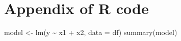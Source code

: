 \documentclass[
  openany]{book}
\newenvironment{Shaded}{\begin{snugshade}}{\end{snugshade}}
\newcommand{\AttributeTok}[1]{\textcolor[rgb]{0.77,0.63,0.00}{#1}}
\newcommand{\FunctionTok}[1]{\textcolor[rgb]{0.00,0.00,0.00}{#1}}
\newcommand{\NormalTok}[1]{#1}
\newcommand{\OtherTok}[1]{\textcolor[rgb]{0.56,0.35,0.01}{#1}}
\newcommand{\SpecialCharTok}[1]{\textcolor[rgb]{0.00,0.00,0.00}{#1}}
\begin{document}
\hypertarget{appendix-appendix}{%
\appendix}


\hypertarget{appendix-of-r-code}{%
\chapter*{Appendix of R code}\label{appendix-of-r-code}}

\begin{Shaded}
\begin{Highlighting}[]
\NormalTok{model }\OtherTok{\textless{}{-}} \FunctionTok{lm}\NormalTok{(y }\SpecialCharTok{\textasciitilde{}}\NormalTok{ x1 }\SpecialCharTok{+}\NormalTok{ x2, }\AttributeTok{data =}\NormalTok{ df)}
\FunctionTok{summary}\NormalTok{(model)}
\end{Highlighting}
\end{Shaded}


\backmatter
\end{document}
